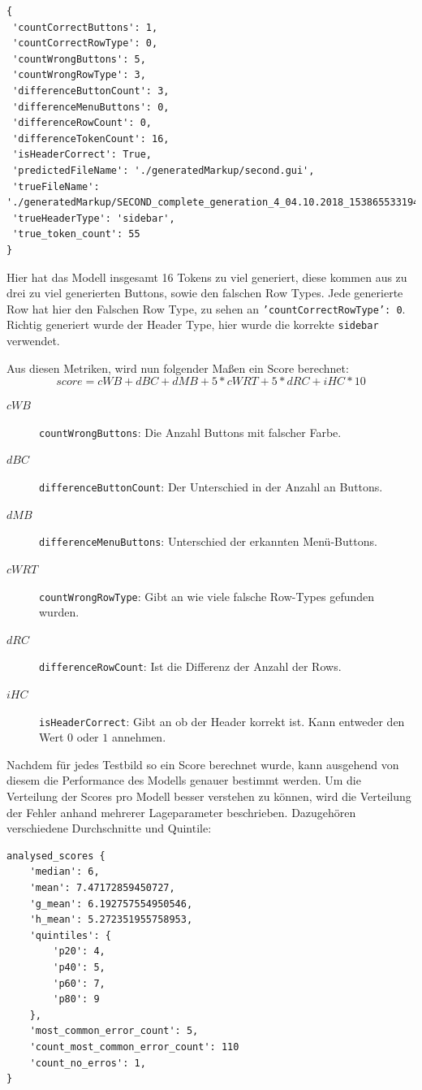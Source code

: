 \documentclass[pdftex,a4paper,halfparskip, article]{scrartcl}
\begin{document}
\begin{verbatim}
{
 'countCorrectButtons': 1,
 'countCorrectRowType': 0,
 'countWrongButtons': 5,
 'countWrongRowType': 3,
 'differenceButtonCount': 3,
 'differenceMenuButtons': 0,
 'differenceRowCount': 0,
 'differenceTokenCount': 16,
 'isHeaderCorrect': True,
 'predictedFileName': './generatedMarkup/second.gui',
 'trueFileName': './generatedMarkup/SECOND_complete_generation_4_04.10.2018_1538655331945.gui',
 'trueHeaderType': 'sidebar',
 'true_token_count': 55
}
\end{verbatim}


Hier hat das Modell insgesamt 16 Tokens zu viel generiert, diese kommen aus zu drei zu viel generierten Buttons, sowie den falschen Row Types. Jede generierte Row hat hier den Falschen Row Type, zu sehen an \texttt{'countCorrectRowType': 0}. Richtig generiert wurde der Header Type, hier wurde die korrekte \texttt{sidebar} verwendet.

Aus diesen Metriken, wird nun folgender Maßen ein Score berechnet:        
\begin{equation}
score = cWB + dBC + dMB + 5 * cWRT + 5 * dRC + iHC * 10
\end{equation}

\begin{description}
	\item[$cWB$] \texttt{countWrongButtons}: Die Anzahl Buttons mit falscher Farbe.
	\item[$dBC$] \texttt{differenceButtonCount}: Der Unterschied in der Anzahl an Buttons.
	\item[$dMB$] \texttt{differenceMenuButtons}: Unterschied der erkannten Menü-Buttons.
	\item[$cWRT$] \texttt{countWrongRowType}: Gibt an wie viele falsche Row-Types gefunden wurden.
	\item[$dRC$] \texttt{differenceRowCount}: Ist die Differenz der Anzahl der Rows.
	\item[$iHC$] \texttt{isHeaderCorrect}: Gibt an ob der Header korrekt ist. Kann entweder den Wert $0$ oder $1$ annehmen.	
\end{description}

Nachdem für jedes Testbild so ein Score berechnet wurde, kann ausgehend von diesem die Performance des Modells genauer bestimmt werden. Um die Verteilung der Scores pro Modell besser verstehen zu können, wird die Verteilung der Fehler anhand mehrerer Lageparameter beschrieben. Dazugehören verschiedene Durchschnitte und Quintile:

  \begin{verbatim}
analysed_scores {
    'median': 6, 
    'mean': 7.47172859450727, 
    'g_mean': 6.192757554950546, 
    'h_mean': 5.272351955758953, 
    'quintiles': {
        'p20': 4,
        'p40': 5, 
        'p60': 7, 
        'p80': 9 
	},
    'most_common_error_count': 5, 
    'count_most_common_error_count': 110
    'count_no_erros': 1, 
}
 \end{verbatim}
\end{document}

